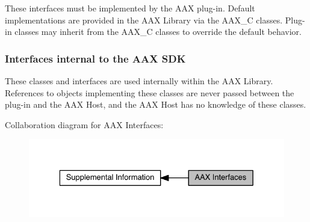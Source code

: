 These interfaces must be implemented by the A\+A\+X plug-\/in. Default implementations are provided in the A\+A\+X Library via the {\ttfamily A\+A\+X\+\_\+\+C} classes. Plug-\/in classes may inherit from the {\ttfamily A\+A\+X\+\_\+\+C} classes to override the default behavior.


\begin{DoxyRefList}
\item[\label{a00003__aax_plugin_implementation000001}%
\hypertarget{a00003__aax_plugin_implementation000001}{}%
Class \hyperlink{a00097}{A\+A\+X\+\_\+\+I\+Effect\+Direct\+Data} ]
\item[\label{a00003__aax_plugin_implementation000002}%
\hypertarget{a00003__aax_plugin_implementation000002}{}%
Class \hyperlink{a00098}{A\+A\+X\+\_\+\+I\+Effect\+G\+U\+I} ]
\item[\label{a00003__aax_plugin_implementation000003}%
\hypertarget{a00003__aax_plugin_implementation000003}{}%
Class \hyperlink{a00099}{A\+A\+X\+\_\+\+I\+Effect\+Parameters} ]
\item[\label{a00003__aax_plugin_implementation000004}%
\hypertarget{a00003__aax_plugin_implementation000004}{}%
Class \hyperlink{a00101}{A\+A\+X\+\_\+\+I\+Host\+Processor} ]
\end{DoxyRefList}\hypertarget{aax_sdk_internal}{}\subsubsection{Interfaces internal to the A\+A\+X S\+D\+K}\label{aax_sdk_internal}
These classes and interfaces are used internally within the A\+A\+X Library. References to objects implementing these classes are never passed between the plug-\/in and the A\+A\+X Host, and the A\+A\+X Host has no knowledge of these classes.


\begin{DoxyRefList}
\item[\label{a00003__aax_sdk_internal000002}%
\hypertarget{a00003__aax_sdk_internal000002}{}%
Class \hyperlink{a00108}{A\+A\+X\+\_\+\+I\+Parameter} ]
\item[\label{a00003__aax_sdk_internal000001}%
\hypertarget{a00003__aax_sdk_internal000001}{}%
Class \hyperlink{a00109}{A\+A\+X\+\_\+\+I\+Parameter\+Value} ]
\item[\label{a00003__aax_sdk_internal000003}%
\hypertarget{a00003__aax_sdk_internal000003}{}%
Class \hyperlink{a00115}{A\+A\+X\+\_\+\+I\+Taper\+Delegate\+Base} ]
\end{DoxyRefList}Collaboration diagram for A\+A\+X Interfaces\+:
\nopagebreak
\begin{figure}[H]
\begin{center}
\leavevmode
\includegraphics[width=329pt]{a00003}
\end{center}
\end{figure}
